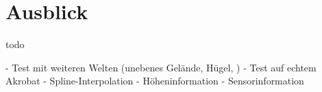 \chapter{Ausblick}
\label{kap7}

todo

- Test mit weiteren Welten (unebenes Gelände, Hügel, )
- Test auf echtem Akrobat
- Spline-Interpolation
- Höheninformation
- Sensorinformation